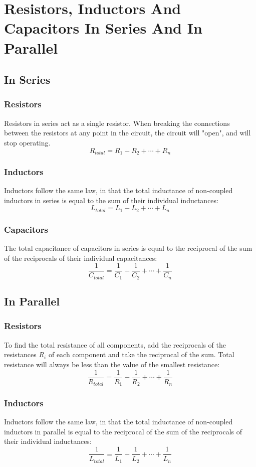 \documentclass[12pt,a4paper,oneside]{article}
\begin{document}
\section{Resistors, Inductors And Capacitors In Series And In Parallel}
\subsection{In Series}
\subsubsection{Resistors}
Resistors in series act as a single resistor. When breaking the connections between the resistors at any point in the circuit, the circuit will "open", and will stop operating.
\[
	R_{total} = R_1 + R_2 + \cdots + R_n
\]
\subsubsection{Inductors}
Inductors follow the same law, in that the total inductance of non-coupled inductors in series is equal to the sum of their individual inductances:
\[
	L_{total} = L_1 + L_2 + \cdots + L_n
\]
\subsubsection{Capacitors}
The total capacitance of capacitors in series is equal to the reciprocal of the sum of the reciprocals of their individual capacitances:
\[
	\frac{1}{C_{total}} = \frac{1}{C_1} + \frac{1}{C_2} + \cdots + \frac{1}{C_n}
\]
\subsection{In Parallel}
\subsubsection{Resistors}
To find the total resistance of all components, add the reciprocals of the resistances \(R_i\) of each component and take the reciprocal of the sum. Total resistance will always be less than the value of the smallest resistance:
\[
	\frac{1}{R_{total}} = \frac{1}{R_1} + \frac{1}{R_2} + \cdots + \frac{1}{R_n}
\]
\subsubsection{Inductors}
Inductors follow the same law, in that the total inductance of non-coupled inductors in parallel is equal to the reciprocal of the sum of the reciprocals of their individual inductances:
\[
	\frac{1}{L_{total}} = \frac{1}{L_1} + \frac{1}{L_2} + \cdots + \frac{1}{L_n}
\]
\end{document}
